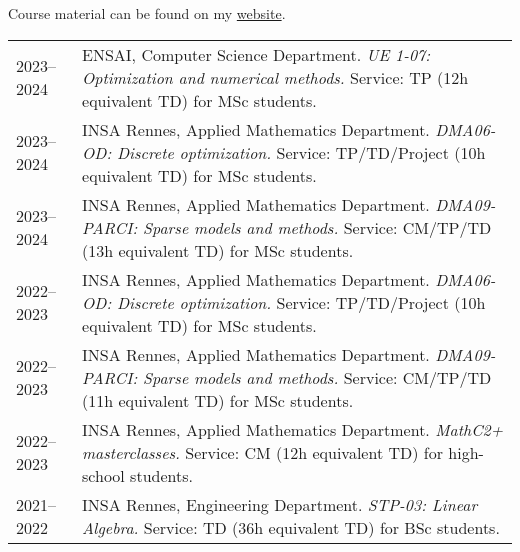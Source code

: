 Course material can be found on my \href{https://theoguyard.github.io/teaching}{website}.

\begin{longtable}[l]{@{}p{}p{}}
    2023--2024 & ENSAI, Computer Science Department. \textit{UE 1-07: Optimization and numerical methods.} Service: TP (12h equivalent TD) for MSc students. \\
    2023--2024 & INSA Rennes, Applied Mathematics Department. \textit{DMA06-OD: Discrete optimization.} Service: TP/TD/Project (10h equivalent TD) for MSc students. \\
    2023--2024 & INSA Rennes, Applied Mathematics Department. \textit{DMA09-PARCI: Sparse models and methods.} Service: CM/TP/TD (13h equivalent TD) for MSc students. \\
    2022--2023 & INSA Rennes, Applied Mathematics Department. \textit{DMA06-OD: Discrete optimization.} Service: TP/TD/Project (10h equivalent TD) for MSc students. \\
    2022--2023 & INSA Rennes, Applied Mathematics Department. \textit{DMA09-PARCI: Sparse models and methods.} Service: CM/TP/TD (11h equivalent TD) for MSc students. \\
    2022--2023 & INSA Rennes, Applied Mathematics Department. \textit{MathC2+ masterclasses.} Service: CM (12h equivalent TD) for high-school students. \\
    2021--2022 & INSA Rennes, Engineering Department. \textit{STP-03: Linear Algebra.} Service: TD (36h equivalent TD) for BSc students. \\
\end{longtable}

